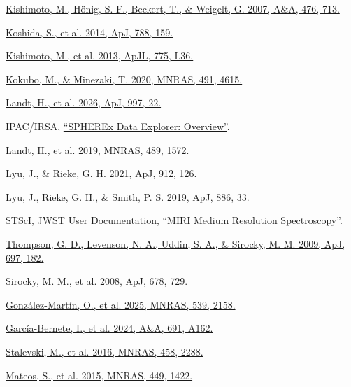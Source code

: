 \documentclass[12pt]{article}
\begin{document}
\noindent [16] \href{https://doi.org/10.1051/0004-6361:20077911}{Kishimoto, M., H\"onig, S. F., Beckert, T., \& Weigelt, G. 2007, A\&A, 476, 713.}\par
\noindent [17] \href{https://arxiv.org/abs/1406.2078}{Koshida, S., et al. 2014, ApJ, 788, 159.}\par
\noindent [18] \href{https://arxiv.org/abs/1308.6517}{Kishimoto, M., et al. 2013, ApJL, 775, L36.}\par
\noindent [19] \href{https://academic.oup.com/mnras/article/491/4/4615/5652205}{Kokubo, M., \& Minezaki, T. 2020, MNRAS, 491, 4615.}\par
\noindent [20] \href{https://arxiv.org/abs/2510.21395}{Landt, H., et al. 2026, ApJ, 997, 22.}\par
\noindent [21] IPAC/IRSA, \href{https://irsa.ipac.caltech.edu/onlinehelp/spherex/spherex/overview.html}{``SPHEREx Data Explorer: Overview''}.\par
\noindent [22] \href{https://arxiv.org/abs/1908.01627}{Landt, H., et al. 2019, MNRAS, 489, 1572.}\par
\noindent [23] \href{https://doi.org/10.3847/1538-4357/abee14}{Lyu, J., \& Rieke, G. H. 2021, ApJ, 912, 126.}\par
\noindent [24] \href{https://doi.org/10.3847/1538-4357/ab481d}{Lyu, J., Rieke, G. H., \& Smith, P. S. 2019, ApJ, 886, 33.}\par
\noindent [25] STScI, JWST User Documentation, \href{https://jwst-docs.stsci.edu/jwst-mid-infrared-instrument/miri-observing-modes/miri-medium-resolution-spectroscopy}{``MIRI Medium Resolution Spectroscopy''}.\par
\noindent [26] \href{https://doi.org/10.1088/0004-637X/697/1/182}{Thompson, G. D., Levenson, N. A., Uddin, S. A., \& Sirocky, M. M. 2009, ApJ, 697, 182.}\par
\noindent [27] \href{https://doi.org/10.1086/586727}{Sirocky, M. M., et al. 2008, ApJ, 678, 729.}\par
\noindent [28] \href{https://arxiv.org/abs/2504.01103}{Gonz\'alez-Mart\'in, O., et al. 2025, MNRAS, 539, 2158.}\par
\noindent [29] \href{https://doi.org/10.1051/0004-6361/202450086}{Garc\'ia-Bernete, I., et al. 2024, A\&A, 691, A162.}\par
\noindent [30] \href{https://doi.org/10.1093/mnras/stw444}{Stalevski, M., et al. 2016, MNRAS, 458, 2288.}\par
\noindent [31] \href{https://doi.org/10.1093/mnras/stv299}{Mateos, S., et al. 2015, MNRAS, 449, 1422.}\par
\end{document}
